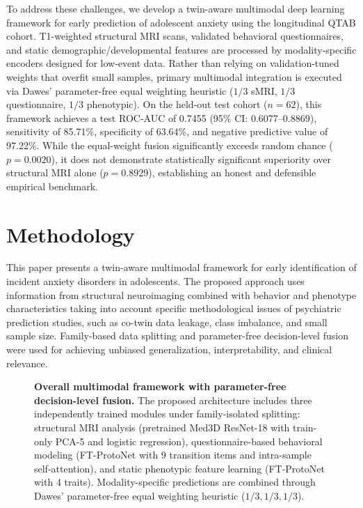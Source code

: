 \documentclass[10pt,letterpaper]{article}
\begin{document}
To address these challenges, we develop a twin-aware multimodal deep learning framework for early prediction of adolescent anxiety using the longitudinal QTAB cohort. T1-weighted structural MRI scans, validated behavioral questionnaires, and static demographic/developmental features are processed by modality-specific encoders designed for low-event data. Rather than relying on validation-tuned weights that overfit small samples, primary multimodal integration is executed via Dawes' parameter-free equal weighting heuristic ($1/3$ sMRI, $1/3$ questionnaire, $1/3$ phenotypic). On the held-out test cohort ($n=62$), this framework achieves a test ROC-AUC of 0.7455 (95\% CI: 0.6077--0.8869), sensitivity of 85.71\%, specificity of 63.64\%, and negative predictive value of 97.22\%. While the equal-weight fusion significantly exceeds random chance ($p = 0.0020$), it does not demonstrate statistically significant superiority over structural MRI alone ($p = 0.8929$), establishing an honest and defensible empirical benchmark.

        \section*{Methodology}

        This paper presents a twin-aware multimodal framework for early identification of incident anxiety disorders in adolescents. The proposed approach uses information from structural neuroimaging combined with behavior and phenotype characteristics taking into account specific methodological issues of psychiatric prediction studies, such as co-twin data leakage, class imbalance, and small sample size. Family-based data splitting and parameter-free decision-level fusion were used for achieving unbiased generalization, interpretability, and clinical relevance.

        \begin{figure}[!h]
        \caption{\textbf{Overall multimodal framework with parameter-free decision-level fusion.}
        The proposed architecture includes three independently trained modules under family-isolated splitting: structural MRI analysis (pretrained Med3D ResNet-18 with train-only PCA-5 and logistic regression), questionnaire-based behavioral modeling (FT-ProtoNet with 9 transition items and intra-sample self-attention), and static phenotypic feature learning (FT-ProtoNet with 4 traits). Modality-specific predictions are combined through Dawes' parameter-free equal weighting heuristic ($1/3, 1/3, 1/3$).}
        \label{fig:main}
        \end{figure}
\end{document}
